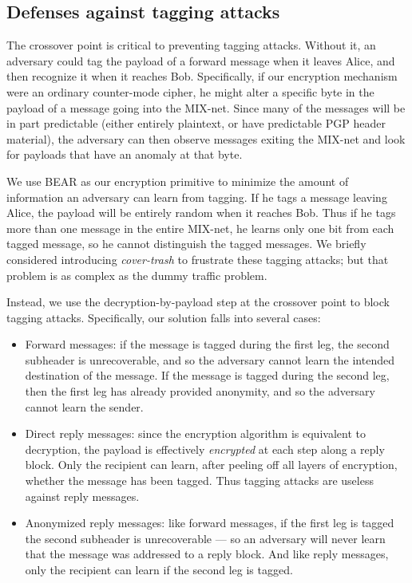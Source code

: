 \documentclass{llncs}
\begin{document}
\subsection{Defenses against tagging attacks}
\label{subsec:tagging}


The crossover point is critical to preventing tagging attacks. Without
it, an adversary could tag the payload of a forward message when it
leaves Alice, and then recognize it when it reaches Bob. Specifically,
if our encryption mechanism were an ordinary counter-mode cipher, he
might alter a specific byte in the payload of a message going into the
MIX-net. Since many of the messages will be in part predictable
(either entirely plaintext, or have predictable PGP header material),
the adversary can then observe messages exiting the MIX-net and
look for payloads that have an anomaly at that byte.

We use BEAR as our encryption primitive to minimize the amount of
information an adversary can learn from tagging. If he tags a message
leaving Alice, the payload will be entirely random when it reaches
Bob. Thus if he tags more than one message in the entire MIX-net, he
learns only one bit from each tagged message, so he cannot distinguish
the tagged messages. We briefly considered introducing \emph{cover-trash}
to frustrate these tagging attacks; but that problem is as complex as
the dummy traffic problem.

Instead, we use the decryption-by-payload step at the crossover point to
block tagging attacks. Specifically, our solution falls into several cases:

\begin{itemize}
\item Forward messages: if the message is tagged during the first leg,
the second subheader is unrecoverable, and so the adversary cannot
learn the intended destination of the message. If the message is tagged
during the second leg, then the first leg has already provided anonymity,
and so the adversary cannot learn the sender.
\item Direct reply messages: since the encryption algorithm is equivalent to
decryption, the payload is effectively \emph{encrypted} at each step
along a reply block. Only the recipient can learn, after peeling off
all layers of encryption, whether the message has been tagged. Thus
tagging attacks are useless against reply messages.
\item Anonymized reply messages: like forward messages, if the first leg
is tagged the second subheader is unrecoverable --- so an adversary will
never learn that the message was addressed to a reply block. And like
reply messages, only the recipient can learn if the second leg is tagged.
\end{itemize}
\end{document}
